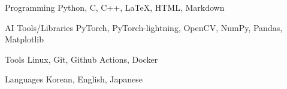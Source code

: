 

\begin{cvskills}

  \cvskill
  {Programming} %
  {Python, C, C++, LaTeX, HTML, Markdown} %

  \cvskill
  {AI Tools/Libraries} %
  {PyTorch, PyTorch-lightning, OpenCV, NumPy, Pandas, Matplotlib} %

  \cvskill
  {Tools} %
  {Linux, Git, Github Actions, Docker} %

  \cvskill
  {Languages} %
  {Korean, English, Japanese} %

\end{cvskills}
